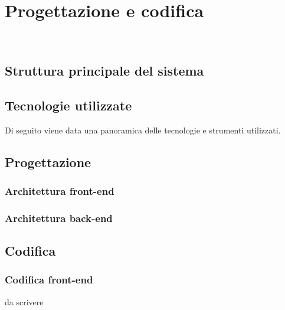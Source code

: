 \chapter{Progettazione e codifica}
\label{cap:progettazione-codifica}

\\

\section{Struttura principale del sistema}

\section{Tecnologie utilizzate}
\label{sec:tecnologie-strumenti}

Di seguito viene data una panoramica delle tecnologie e strumenti utilizzati.


\section{Progettazione}
\label{sec:progettazione}

\subsection{Architettura front-end}\label{subsec:architettura-front-end}
\subsection{Architettura back-end}\label{subsec:architettura-back-end}





\section{Codifica}
\subsection{Codifica front-end}\label{subsec:codifica-front-end}
da scrivere

